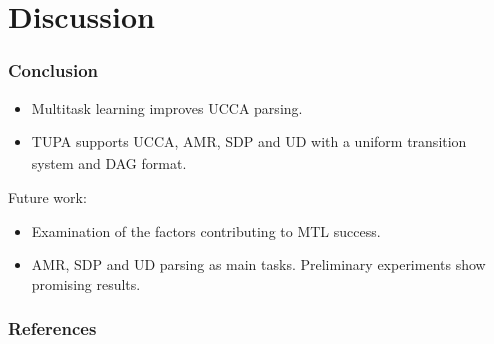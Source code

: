 \documentclass[t,xcolor={svgnames}]{beamer}
\newcommand{\parser}[1]{TUPA\textsubscript{#1}}
\begin{document}
\section{Discussion}



\begin{frame}
\frametitle{Conclusion}
\begin{itemize}
 \item Multitask learning improves UCCA parsing.
 \item \parser{} supports UCCA, AMR, SDP and UD with a uniform transition system and DAG format.
\end{itemize}

Future work:
\begin{itemize}
 \item Examination of the factors contributing to MTL success.
 \item AMR, SDP and UD parsing as main tasks. Preliminary experiments show promising results.
\end{itemize}

\end{frame}



\begin{frame}[allowframebreaks]
\frametitle{References}

\tiny
\end{frame}
\end{document}
